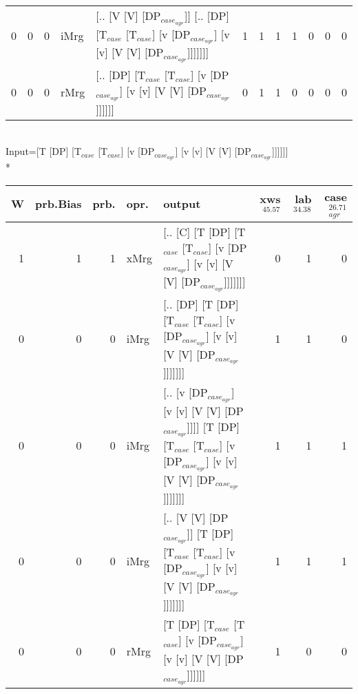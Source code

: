 \begin{tabularx}{\linewidth}{rrrlXrrrrrrr}
   0 &       0 &   0 & iMrg & [.. [V [V] [DP$_{case_{agr}}$]] [.. [DP] [T$_{case}$ [T$_{case}$] [v [DP$_{case_{agr}}$] [v [v] [V [V] [DP$_{case_{agr}}$]]]]]]]                                             &            1 &             1 &             1 &                  1 &              0 &                0 &              0 \\
   0 &       0 &   0 & rMrg & [.. [DP] [T$_{case}$ [T$_{case}$] [v [DP$_{case_{agr}}$] [v [v] [V [V] [DP$_{case_{agr}}$]]]]]]                                                                        &            0 &             1 &             1 &                  0 &              0 &                0 &              0 \\
\hline
\end{tabularx}\endgroup\\
\begingroup\scriptsize Input=[T [DP] [T$_{case}$ [T$_{case}$] [v [DP$_{case_{agr}}$] [v [v] [V [V] [DP$_{case_{agr}}$]]]]]]\\*
\begin{tabularx}{\linewidth}{rrrlXrrr}
\hline
   W &   prb.Bias &   prb. & opr.   & output                                                                                                                          &   xws$^{45.57}$ &   lab$^{34.38}$ &   case$_{agr}^{26.71}$ \\
\hline
   1 &       1 &   1 & xMrg & [.. [C] [T [DP] [T$_{case}$ [T$_{case}$] [v [DP$_{case_{agr}}$] [v [v] [V [V] [DP$_{case_{agr}}$]]]]]]]                                             &             0 &             1 &                  0 \\
   0 &       0 &   0 & iMrg & [.. [DP] [T [DP] [T$_{case}$ [T$_{case}$] [v [DP$_{case_{agr}}$] [v [v] [V [V] [DP$_{case_{agr}}$]]]]]]]                                            &             1 &             1 &                  0 \\
   0 &       0 &   0 & iMrg & [.. [v [DP$_{case_{agr}}$] [v [v] [V [V] [DP$_{case_{agr}}$]]]] [T [DP] [T$_{case}$ [T$_{case}$] [v [DP$_{case_{agr}}$] [v [v] [V [V] [DP$_{case_{agr}}$]]]]]]] &             1 &             1 &                  1 \\
   0 &       0 &   0 & iMrg & [.. [V [V] [DP$_{case_{agr}}$]] [T [DP] [T$_{case}$ [T$_{case}$] [v [DP$_{case_{agr}}$] [v [v] [V [V] [DP$_{case_{agr}}$]]]]]]]                           &             1 &             1 &                  1 \\
   0 &       0 &   0 & rMrg & [T [DP] [T$_{case}$ [T$_{case}$] [v [DP$_{case_{agr}}$] [v [v] [V [V] [DP$_{case_{agr}}$]]]]]]                                                      &             1 &             0 &                  0 \\
\hline
\end{tabularx}\endgroup\\
